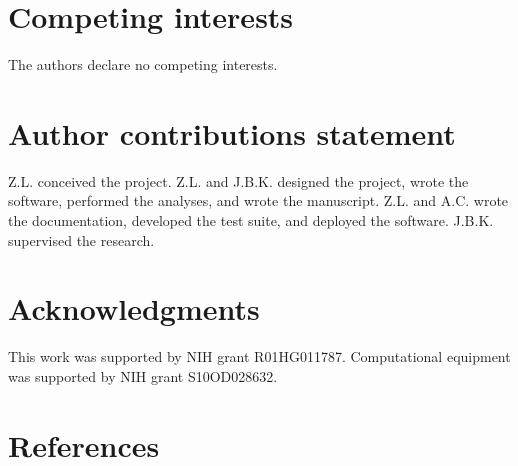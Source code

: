 \documentclass[twoside]{kinneylab_preprintstyle}
\begin{document}
\section*{Competing interests}
The authors declare no competing interests. 

\section*{Author contributions statement}
Z.L. conceived the project. Z.L. and J.B.K. designed the project, wrote the software, performed the analyses, and wrote the manuscript. Z.L. and A.C. wrote the documentation, developed the test suite, and deployed the software. J.B.K. supervised the research.

\section*{Acknowledgments}
This work was supported by NIH grant R01HG011787. Computational equipment was supported by NIH grant S10OD028632.

\section*{References}


\end{document}
